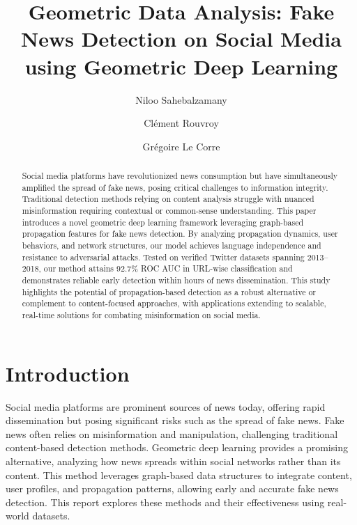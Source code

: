 \documentclass[sigconf,nonacm]{acmart}
\begin{document}
\title{Geometric Data Analysis: Fake News Detection on Social Media using Geometric Deep Learning\\
\vspace{0.5em}} %


\author{Niloo Sahebalzamany}

\author{Clément Rouvroy}

\author{Grégoire Le Corre}



\begin{abstract}
Social media platforms have revolutionized news consumption but have simultaneously amplified the spread of fake news, posing critical challenges to information integrity. Traditional detection methods relying on content analysis struggle with nuanced misinformation requiring contextual or common-sense understanding. This paper introduces a novel geometric deep learning framework leveraging graph-based propagation features for fake news detection. By analyzing propagation dynamics, user behaviors, and network structures, our model achieves language independence and resistance to adversarial attacks. Tested on verified Twitter datasets spanning 2013–2018, our method attains 92.7\% ROC AUC in URL-wise classification and demonstrates reliable early detection within hours of news dissemination. This study highlights the potential of propagation-based detection as a robust alternative or complement to content-focused approaches, with applications extending to scalable, real-time solutions for combating misinformation on social media.
\end{abstract}

\maketitle

\section{Introduction}
Social media platforms are prominent sources of news today, offering rapid dissemination but posing significant risks such as the spread of fake news. Fake news often relies on misinformation and manipulation, challenging traditional content-based detection methods. Geometric deep learning provides a promising alternative, analyzing how news spreads within social networks rather than its content. This method leverages graph-based data structures to integrate content, user profiles, and propagation patterns, allowing early and accurate fake news detection. This report explores these methods and their effectiveness using real-world datasets.
\end{document}
